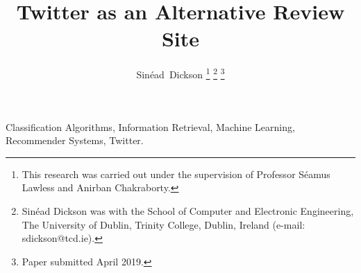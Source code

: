 \documentclass[journal]{IEEEtran}
\begin{document}
\title{Twitter as an Alternative Review Site}

\author{Sin\'ead~Dickson
\thanks{This research was carried out under the supervision of Professor S\'eamus Lawless and Anirban Chakraborty.}
\thanks{Sin\'ead Dickson was with the School of Computer and Electronic Engineering, The University of Dublin, Trinity College, Dublin, Ireland (e-mail: sdickson@tcd.ie).}
\thanks{Paper submitted April 2019.}
}

\maketitle



\begin{IEEEkeywords}
Classification Algorithms, Information Retrieval, Machine Learning, Recommender Systems, Twitter.
\end{IEEEkeywords}







\newpage


\end{document}
